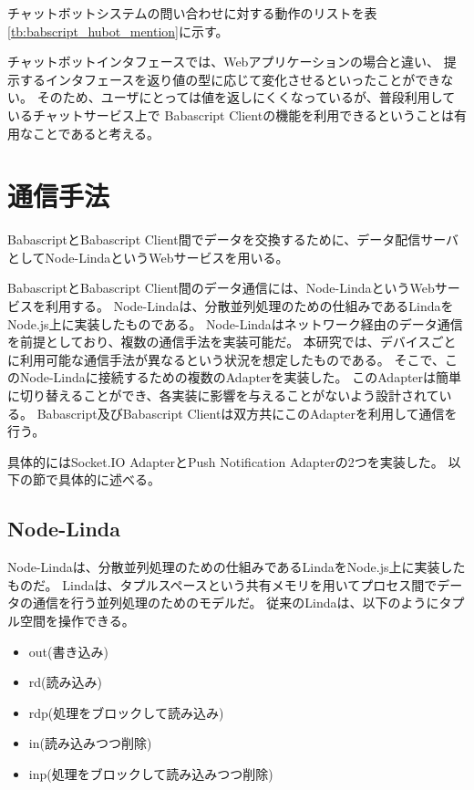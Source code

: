 チャットボットシステムの問い合わせに対する動作のリストを表\ref{tb:babscript_hubot_mention}に示す。

チャットボットインタフェースでは、Webアプリケーションの場合と違い、
提示するインタフェースを返り値の型に応じて変化させるといったことができない。
そのため、ユーザにとっては値を返しにくくなっているが、普段利用しているチャットサービス上で
Babascript
Clientの機能を利用できるということは有用なことであると考える。

\section{通信手法}\label{ux901aux4fe1ux624bux6cd5}

BabascriptとBabascript
Client間でデータを交換するために、データ配信サーバとしてNode-LindaというWebサービスを用いる。

BabascriptとBabascript
Client間のデータ通信には、Node-LindaというWebサービスを利用する。
Node-Lindaは、分散並列処理のための仕組みであるLindaをNode.js上に実装したものである。
Node-Lindaはネットワーク経由のデータ通信を前提としており、複数の通信手法を実装可能だ。
本研究では、デバイスごとに利用可能な通信手法が異なるという状況を想定したものである。
そこで、このNode-Lindaに接続するための複数のAdapterを実装した。
このAdapterは簡単に切り替えることができ、各実装に影響を与えることがないよう設計されている。
Babascript及びBabascript
Clientは双方共にこのAdapterを利用して通信を行う。

具体的にはSocket.IO AdapterとPush Notification Adapterの2つを実装した。
以下の節で具体的に述べる。

\subsection{Node-Linda}\label{node-linda}

Node-Linda\cite{node-linda}は、分散並列処理のための仕組みであるLinda\cite{linda}をNode.js上に実装したものだ。
Lindaは、タプルスペースという共有メモリを用いてプロセス間でデータの通信を行う並列処理のためのモデルだ。
従来のLindaは、以下のようにタプル空間を操作できる。

\begin{itemize}
\itemsep1pt\parskip0pt
\item
  out(書き込み)
\item
  rd(読み込み)
\item
  rdp(処理をブロックして読み込み)
\item
  in(読み込みつつ削除)
\item
  inp(処理をブロックして読み込みつつ削除)
\end{itemize}

